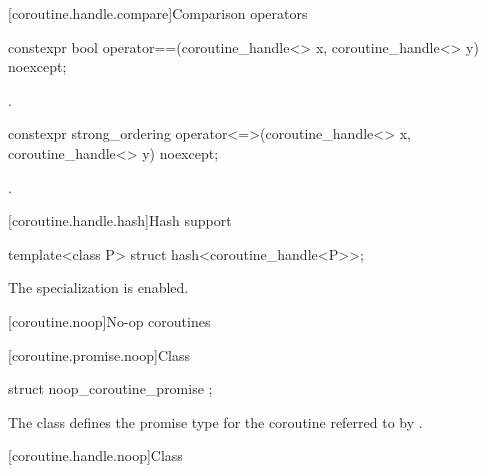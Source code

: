 [coroutine.handle.compare]{Comparison operators}

%
%
\begin{itemdecl}
constexpr bool operator==(coroutine_handle<> x, coroutine_handle<> y) noexcept;
\end{itemdecl}

\begin{itemdescr}
\pnum
\returns
{}.
\end{itemdescr}

%
\begin{itemdecl}
constexpr strong_ordering operator<=>(coroutine_handle<> x, coroutine_handle<> y) noexcept;
\end{itemdecl}

\begin{itemdescr}
\pnum
\returns
{}.
\end{itemdescr}

[coroutine.handle.hash]{Hash support}

%
\begin{itemdecl}
template<class P> struct hash<coroutine_handle<P>>;
\end{itemdecl}

\begin{itemdescr}
\pnum
The specialization is enabled.
\end{itemdescr}

[coroutine.noop]{No-op coroutines}

[coroutine.promise.noop]{Class }

%
\begin{itemdecl}
struct noop_coroutine_promise {};
\end{itemdecl}

\begin{itemdescr}
\pnum
The class  defines the promise type for
the coroutine referred to
by .
\end{itemdescr}

[coroutine.handle.noop]{Class }

